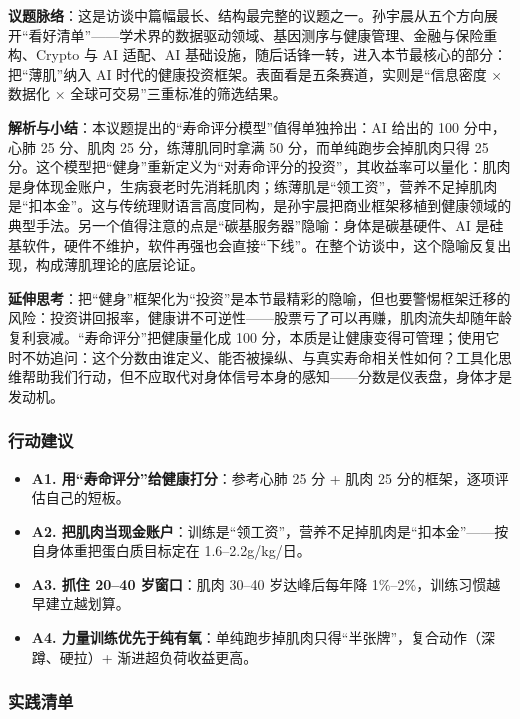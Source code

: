 \textbf{议题脉络}：这是访谈中篇幅最长、结构最完整的议题之一。孙宇晨从五个方向展开``看好清单''------学术界的数据驱动领域、基因测序与健康管理、金融与保险重构、Crypto
与 AI 适配、AI
基础设施，随后话锋一转，进入本节最核心的部分：把``薄肌''纳入 AI
时代的健康投资框架。表面看是五条赛道，实则是``信息密度 × 数据化 ×
全球可交易''三重标准的筛选结果。

\textbf{解析与小结}：本议题提出的``寿命评分模型''值得单独拎出：AI 给出的
100 分中，心肺 25 分、肌肉 25 分，练薄肌同时拿满 50
分，而单纯跑步会掉肌肉只得 25
分。这个模型把``健身''重新定义为``对寿命评分的投资''，其收益率可以量化：肌肉是身体现金账户，生病衰老时先消耗肌肉；练薄肌是``领工资''，营养不足掉肌肉是``扣本金''。这与传统理财语言高度同构，是孙宇晨把商业框架移植到健康领域的典型手法。另一个值得注意的点是``碳基服务器''隐喻：身体是碳基硬件、AI
是硅基软件，硬件不维护，软件再强也会直接``下线''。在整个访谈中，这个隐喻反复出现，构成薄肌理论的底层论证。

\textbf{延伸思考}：把``健身''框架化为``投资''是本节最精彩的隐喻，但也要警惕框架迁移的风险：投资讲回报率，健康讲不可逆性------股票亏了可以再赚，肌肉流失却随年龄复利衰减。``寿命评分''把健康量化成
100
分，本质是让健康变得可管理；使用它时不妨追问：这个分数由谁定义、能否被操纵、与真实寿命相关性如何？工具化思维帮助我们行动，但不应取代对身体信号本身的感知------分数是仪表盘，身体才是发动机。

\subsubsection{行动建议}

\begin{itemize}
\tightlist
\item
  \textbf{A1. 用``寿命评分''给健康打分}：参考心肺 25 分 + 肌肉 25
  分的框架，逐项评估自己的短板。
\item
  \textbf{A2.
  把肌肉当现金账户}：训练是``领工资''，营养不足掉肌肉是``扣本金''------按自身体重把蛋白质目标定在
  1.6--2.2g/kg/日。
\item
  \textbf{A3. 抓住 20--40 岁窗口}：肌肉 30--40 岁达峰后每年降
  1\%--2\%，训练习惯越早建立越划算。
\item
  \textbf{A4.
  力量训练优先于纯有氧}：单纯跑步掉肌肉只得``半张牌''，复合动作（深蹲、硬拉）+
  渐进超负荷收益更高。
\end{itemize}

\subsubsection{实践清单}

